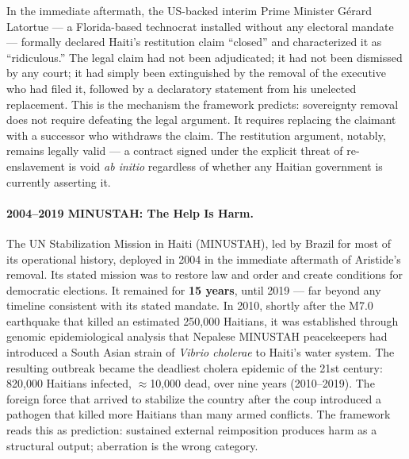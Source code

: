 In the immediate aftermath, the US-backed interim Prime Minister G\'{e}rard Latortue --- a Florida-based technocrat installed without any electoral mandate --- formally declared Haiti's restitution claim ``closed'' and characterized it as ``ridiculous.'' The legal claim had not been adjudicated; it had not been dismissed by any court; it had simply been extinguished by the removal of the executive who had filed it, followed by a declaratory statement from his unelected replacement. This is the mechanism the framework predicts: sovereignty removal does not require defeating the legal argument. It requires replacing the claimant with a successor who withdraws the claim. The restitution argument, notably, remains legally valid --- a contract signed under the explicit threat of re-enslavement is void \textit{ab initio} regardless of whether any Haitian government is currently asserting it.

\paragraph{2004--2019 MINUSTAH: The Help Is Harm.}
The UN Stabilization Mission in Haiti (MINUSTAH), led by Brazil for most of its operational history, deployed in 2004 in the immediate aftermath of Aristide's removal. Its stated mission was to restore law and order and create conditions for democratic elections. It remained for \textbf{15 years}, until 2019 --- far beyond any timeline consistent with its stated mandate. In 2010, shortly after the M7.0 earthquake that killed an estimated 250,000 Haitians, it was established through genomic epidemiological analysis \cite{lancet_minustah_cholera} that Nepalese MINUSTAH peacekeepers had introduced a South Asian strain of \textit{Vibrio cholerae} to Haiti's water system. The resulting outbreak became the deadliest cholera epidemic of the 21st century: 820,000 Haitians infected, $\approx$10,000 dead, over nine years (2010--2019). The foreign force that arrived to stabilize the country after the coup introduced a pathogen that killed more Haitians than many armed conflicts. The framework reads this as prediction: sustained external reimposition produces harm as a structural output; aberration is the wrong category.


